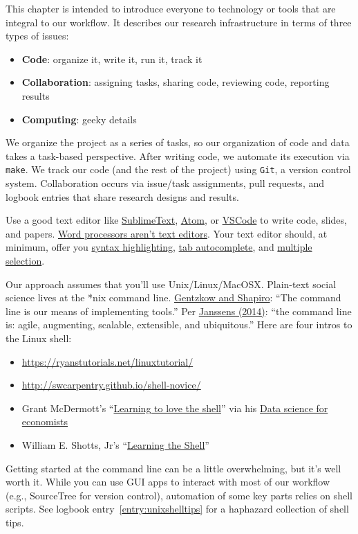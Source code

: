 This chapter is intended to introduce everyone to technology or tools that are integral to our workflow.
It describes our research infrastructure in terms of three types of issues:
\begin{itemize}
\item \textbf{Code}: organize it, write it, run it, track it
\item \textbf{Collaboration}: assigning tasks, sharing code, reviewing code, reporting results
\item \textbf{Computing}: geeky details
\end{itemize}

We organize the project as a series of tasks, so our organization of code and data takes a task-based perspective.
After writing code, we automate its execution via \texttt{make}.
We track our code (and the rest of the project) using \texttt{Git}, a version control system.
Collaboration occurs via issue/task assignments, pull requests, and logbook entries that share research designs and results.

Use a good text editor like
\href{https://www.sublimetext.com/}{SublimeText},
\href{https://atom.io/}{Atom},
or
\href{https://code.visualstudio.com/}{VSCode}
to write code, slides, and papers.
\href{http://plain-text.co/write-and-edit.html}{Word processors aren't text editors}.
Your text editor should, at minimum, offer you
\href{https://en.wikipedia.org/wiki/Syntax_highlighting}{syntax highlighting},
\href{https://en.wikipedia.org/wiki/Command-line_completion}{tab autocomplete},
and \href{https://www.sublimetext.com/}{multiple selection}.

Our approach assumes that you'll use Unix/Linux/MacOSX.
Plain-text social science lives at the *nix command line.
\href{https://github.com/gslab-econ/ra-manual/wiki/Getting-Started}{Gentzkow and Shapiro}: ``The command line is our means of implementing tools.''
Per \href{https://jeroenjanssens.com/dsatcl/chapter-1-introduction.html\#why-data-science-at-the-command-line}{Janssens (2014)}: ``the command line is: agile, augmenting, scalable, extensible, and ubiquitous.''
Here are four intros to the Linux shell:
\begin{itemize}
	\item \url{https://ryanstutorials.net/linuxtutorial/}
	\item \url{http://swcarpentry.github.io/shell-novice/}
	\item Grant McDermott's ``\href{https://raw.githack.com/uo-ec607/lectures/master/03-shell/03-shell.html\#1}{Learning to love the shell}'' via his \href{https://github.com/uo-ec607/lectures}{Data science for economists}
	\item William E. Shotts, Jr's ``\href{http://linuxcommand.org/lc3_learning_the_shell.php}{Learning the Shell}''
\end{itemize}
Getting started at the command line can be a little overwhelming, but it's well worth it.
While you can use GUI apps to interact with most of our workflow (e.g., SourceTree for version control),
automation of some key parts relies on shell scripts.
See logbook entry~\ref{entry:unixshelltips} for a haphazard collection of shell tips.

